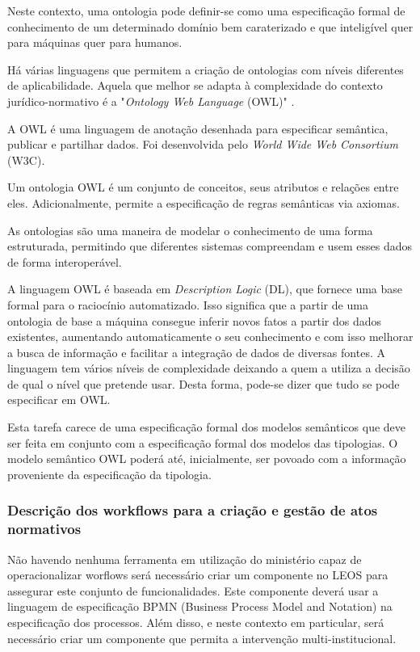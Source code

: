 Neste contexto, uma ontologia pode definir-se como uma especificação formal de conhecimento de um determinado domínio bem 
caraterizado e que inteligível quer para máquinas quer para humanos.

Há várias linguagens que permitem a criação de ontologias com níveis diferentes de aplicabilidade.
Aquela que melhor se adapta à complexidade do contexto jurídico-normativo é a "\emph{Ontology Web Language} (OWL)" 
\cite{owl,owl2}.

A OWL é uma linguagem de anotação desenhada para especificar semântica, publicar e partilhar dados. 
Foi desenvolvida pelo \emph{World Wide Web Consortium} (W3C).

Um ontologia OWL é um conjunto de conceitos, seus atributos e relações entre eles. 
Adicionalmente, permite a especificação de regras semânticas via axiomas.

As ontologias são uma maneira de modelar o conhecimento de uma forma estruturada, permitindo que diferentes sistemas 
compreendam e usem esses dados de forma interoperável.

A linguagem OWL é baseada em \emph{Description Logic} (DL), que fornece uma base formal para o raciocínio automatizado. 
Isso significa que a partir de uma ontologia de base a máquina consegue inferir novos fatos a partir dos dados existentes, 
aumentando automaticamente o seu conhecimento e com isso 
melhorar a busca de informação e facilitar a integração de dados de diversas fontes.
A linguagem tem vários níveis de complexidade deixando a quem a utiliza a decisão de qual o nível que pretende usar. 
Desta forma, pode-se dizer que tudo se pode especificar em OWL.

Esta tarefa carece de uma especificação formal dos modelos semânticos que deve ser feita em conjunto com a 
especificação formal dos modelos das tipologias.
O modelo semântico OWL poderá até, inicialmente, ser povoado com a informação proveniente da especificação 
da tipologia.

\subsubsection{Descrição dos workflows para a criação e gestão de atos normativos}

Não havendo nenhuma ferramenta em utilização do ministério capaz de operacionalizar worflows será 
necessário criar um componente no LEOS para assegurar este conjunto de funcionalidades.
Este componente deverá usar a linguagem de especificação BPMN (Business Process Model and Notation)
na especificação dos processos. Além disso, e neste contexto em particular, será necessário 
criar um componente que permita a intervenção multi-institucional.

